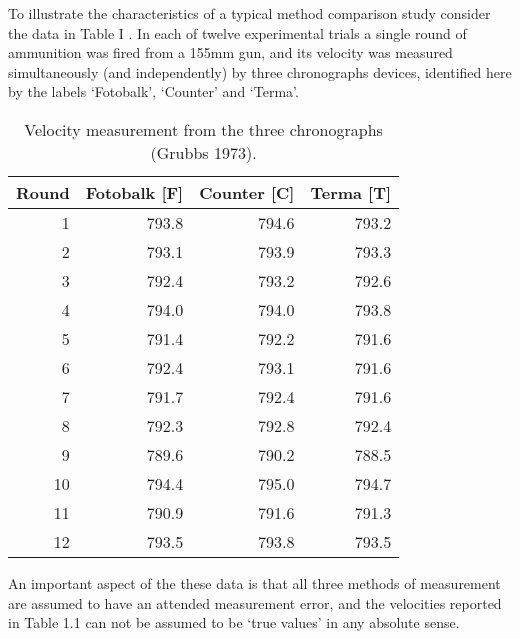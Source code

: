 \documentclass[12pt, a4paper]{report}
\begin{document}
To illustrate the characteristics of a typical method comparison
study consider the data in Table I \citep{Grubbs73}. In each of
twelve experimental trials a single round of ammunition was fired
from a 155mm gun, and its velocity was measured simultaneously
(and independently) by three chronographs devices, identified here
by the labels `Fotobalk', `Counter' and `Terma'.
\smallskip


\newpage

\begin{table}[ht]
	\begin{center}
		\begin{tabular}{rrrr}
			\hline
			Round& Fotobalk [F] & Counter [C]& Terma [T]\\
			\hline
			1 & 793.8 & 794.6 & 793.2 \\
			2 & 793.1 & 793.9 & 793.3 \\
			3 & 792.4 & 793.2 & 792.6 \\
			4 & 794.0 & 794.0 & 793.8 \\
			5 & 791.4 & 792.2 & 791.6 \\
			6 & 792.4 & 793.1 & 791.6 \\
			7 & 791.7 & 792.4 & 791.6 \\
			8 & 792.3 & 792.8 & 792.4 \\
			9 & 789.6 & 790.2 & 788.5 \\
			10 & 794.4 & 795.0 & 794.7 \\
			11 & 790.9 & 791.6 & 791.3 \\
			12 & 793.5 & 793.8 & 793.5 \\
			\hline
		\end{tabular}
		\caption{Velocity measurement from the three chronographs (Grubbs
			1973).}
	\end{center}
\end{table}

An important aspect of the these data is that all three methods of
measurement are assumed to have an attended measurement error, and
the velocities reported in Table 1.1 can not be assumed to be
`true values' in any absolute sense.

\end{document}
